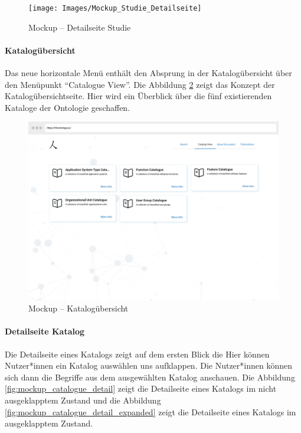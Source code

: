 \begin{figure}[H]
	\centering
    	\texttt{[image: Images/Mockup\_Studie\_Detailseite]}
   	\caption[Mockup -- Detailseite Studie]{Mockup -- Detailseite Studie}
   	\label{fig:mockup_study_detail}
\end{figure}

\clearpage

\paragraph{Katalogübersicht}

Das neue horizontale Menü enthält den Absprung in der Katalogübersicht über den Menüpunkt \enquote{Catalogue View}.
Die Abbildung \ref{fig:mockup_catalogue_overview} zeigt das Konzept der Katalogübersichtseite.
Hier wird ein Überblick über die fünf existierenden Kataloge der Ontologie geschaffen.

\begin{figure}[ht]
	\centering
    	\includegraphics[width=1.45\textwidth, angle=90]{Images/Mockup_Katalog_Uebersicht}
   	\caption[Mockup -- Katalogübersicht]{Mockup -- Katalogübersicht}
   	\label{fig:mockup_catalogue_overview}
\end{figure}

\clearpage

\paragraph{Detailseite Katalog}

Die Detailseite eines Katalogs zeigt auf dem ersten Blick die 
Hier können Nutzer*innen ein Katalog auswählen uns aufklappen.
Die Nutzer*innen können sich dann die Begriffe aus dem ausgewählten Katalog anschauen.
Die Abbildung \ref{fig:mockup_catalogue_detail} zeigt die Detailseite eines Katalogs im nicht ausgeklapptem Zustand und die Abbildung \ref{fig:mockup_catalogue_detail_expanded} zeigt die Detailseite eines Katalogs im ausgeklapptem Zustand.

